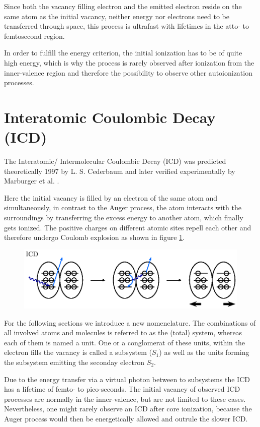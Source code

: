 Since both the vacancy filling electron and the emitted electron reside
on the same atom as the initial vacancy, neither energy nor electrons need
to be transferred through space, this process is ultrafast with lifetimes
in the atto- to femtosecond region.

In order to fulfill the energy criterion, the initial ionization has to
be of quite high energy, which is why the process is rarely observed after
ionization from the inner-valence region and therefore the possibility to
observe other autoionization processes.

\section{Interatomic Coulombic Decay (ICD)}
The Interatomic/ Intermolecular Coulombic Decay (ICD) was predicted
theoretically 1997 by L. S. Cederbaum \cite{Cederbaum97}
and later verified experimentally by Marburger et al. \cite{Marburger03}.

Here the initial vacancy is filled by an electron of the same atom and simultaneously,
in contrast to the Auger process, the atom interacts with the surroundings by
transferring the excess energy to another atom, which finally gets ionized. The
positive charges on different atomic sites repell each other and therefore undergo
Coulomb explosion as shown in figure \ref{figure:icd_process}.

\begin{figure}[h]
 \centering
 \includegraphics{pics/icd-pspic.eps}
 \caption{}
 \label{figure:icd_process}
\end{figure}

For the following sections we introduce a new nomenclature. The combinations
of all involved atoms and molecules is referred to as the (total) system, whereas
each of them is named a unit. One or a conglomerat of these units, within
the electron fills the vacancy is called a subsystem ($S_1$) as well as the units
forming the 
subsystem emitting the seconday electron $S_2$.

Due to the energy transfer via a virtual photon between to subsystems
the ICD has a lifetime of femto- to pico-seconds.
The initial vacancy of observed ICD processes are normally in the inner-valence,
but are not limited to these cases. Nevertheless, one might rarely observe
an ICD after core ionization, because the Auger process would then be energetically
allowed and outrule the slower ICD.



